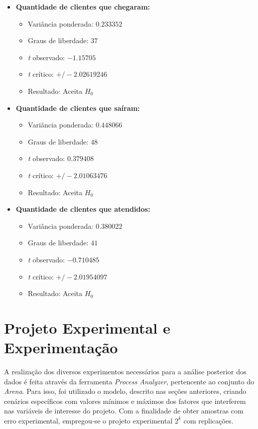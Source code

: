 \documentclass[pt,disc,oneside]{ufscpgeasthesis}
\begin{document}
			\begin{itemize}
				\item{\textbf{Quantidade de clientes que chegaram:}}
				\begin{itemize}
					\item{Variância ponderada:} $0.233352$
					\item{Graus de liberdade:} $37$
					\item{\textit{t} observado:} $-1.15705$
					\item{\textit{t} crítico:} $+/- 2.02619246$
					\item{Resultado:} Aceita $H_0$
				\end{itemize}

				\item{\textbf{Quantidade de clientes que saíram:}}
				\begin{itemize}
					\item{Variância ponderada:} $0.448066$
					\item{Graus de liberdade:} $48$
					\item{\textit{t} observado:} $0.379408$
					\item{\textit{t} crítico:} $+/- 2.01063476$
					\item{Resultado:} Aceita $H_0$
				\end{itemize}

				\item{\textbf{Quantidade de clientes que atendidos:}}
				\begin{itemize}
					\item{Variância ponderada:} $0.380022$
					\item{Graus de liberdade:} $41$
					\item{\textit{t} observado:} $-0.710485$
					\item{\textit{t} crítico:} $+/- 2.01954097$
					\item{Resultado:} Aceita $H_0$
				\end{itemize}
			\end{itemize}

		\section{Projeto Experimental e Experimentação}
		\label{sec:experimentos}

			A realização dos diversos experimentos necessários para a análise posterior dos dados é feita através da ferramenta \textit{Process Analyzer}, pertencente ao conjunto do \textit{Arena}.
			Para isso, foi utilizado o modelo, descrito nas seções anteriores, criando cenários específicos com valores mínimos e máximos dos fatores que interferem nas variáveis de interesse do projeto.
			Com a finalidade de obter amostras com erro experimental, empregou-se o projeto experimental $2^k$ com replicações.
			
\end{document}
